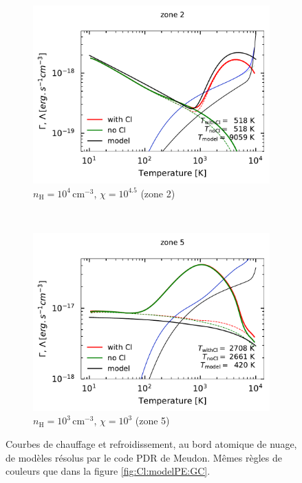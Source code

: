 \begin{figure}[!h]
    \centering
    \begin{subfigure}[t]{0.49\textwidth} %
        \centering \includegraphics[trim = {0 0 0 1cm },clip,width=1\textwidth]{figure/Cl/particuliers/GCcomp_Cl_2.pdf}
        \caption{$n_\mathrm{H}=10^4 \, \mathrm{cm}^{-3}$, $\chi=10^{4.5}$ (zone 2)}
        \label{fig:Cl:particulier:2}
    \end{subfigure}
    ~ 
    \begin{subfigure}[t]{0.49\textwidth}
        \centering \includegraphics[trim = {0 0 0 1cm },clip,width=1\textwidth]{figure/Cl/particuliers/GCcomp_Cl_5.pdf}
        \caption{$n_\mathrm{H}=10^3 \, \mathrm{cm}^{-3}$, $\chi=10^3$ (zone 5)}
        \label{fig:Cl:particulier:4}
    \end{subfigure}
    \caption{Courbes de chauffage et refroidissement, au bord atomique de nuage, de modèles résolus par le code PDR de Meudon. Mêmes règles de couleurs que dans la figure \ref{fig:Cl:modelPE:GC}.}
\end{figure}



